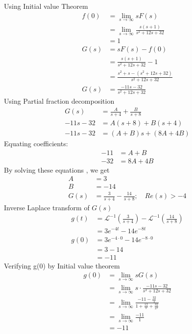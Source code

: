 \documentclass[journal,12pt,twocolumn]{IEEEtran}
\theoremstyle{remark}
\newcommand{\brak}[1]{\left(#1\right)}
\begin{document}
Using Initial value Theorem 
\begin{align}
    f(0) &= \lim_{s \to \infty} sF(s) \\
         &= \lim_{s \to \infty} \frac{s(s+1)}{s^2 + 12s + 32} \\
         &= 1 \\
    G(s) &= sF(s) - f(0) \\
         &= \frac{s(s+1)}{s^2 + 12s + 32} - 1 \\
         &= \frac{s^2 + s - (s^2 + 12s + 32)}{s^2 + 12s + 32} \\
         G(s) &= \frac{-11s - 32}{s^2 + 12s + 32} 
\end{align}
Using Partial fraction decomposition 
\begin{align}
      G(s)   &= \frac{A}{s+4} + \frac{B}{s+8}  \\
    -11s - 32 &= A(s+8) + B(s+4) \\
    -11s - 32 &= (A + B)s + (8A + 4B)
\end{align}
Equating coefficients:
\begin{align}
     -11 &= A + B \\
    -32 &= 8A + 4B
\end{align}
By solving these equations , we get 
\begin{align}
    A &= 3 \\
    B &= -14 \\
    G(s) &=\frac{3}{s+4} - \frac{14}{s+8} ; \quad Re(s) > -4
\end{align}
Inverse Laplace transform of $G(s)$ 
\begin{align}
g(t) &=\mathcal{L}^{-1}\brak{\frac{3}{s+4}} -\mathcal{L}^{-1}\brak{\frac{14}{s+8}} \\
   &= 3e^{-4t} - 14e^{-8t} \\
g(0) &= 3e^{-4 \cdot 0} - 14e^{-8 \cdot 0} \\
         &= 3 - 14 \\
         &= -11
\end{align}
Verifying g(0) by Initial value theorem
\begin{align}
    g(0) &= \lim_{s \to \infty} sG(s) \\
         &= \lim_{s \to \infty} s \cdot \frac{-11s - 32}{s^2 + 12s + 32} \\
         &= \lim_{s \to \infty} \frac{-11 - \frac{32}{s}}{1 + \frac{12}{s} + \frac{32}{s^2}} \\
         &= \lim_{s \to \infty} \frac{-11}{1} \\
         &= -11
\end{align}
\end{document}
